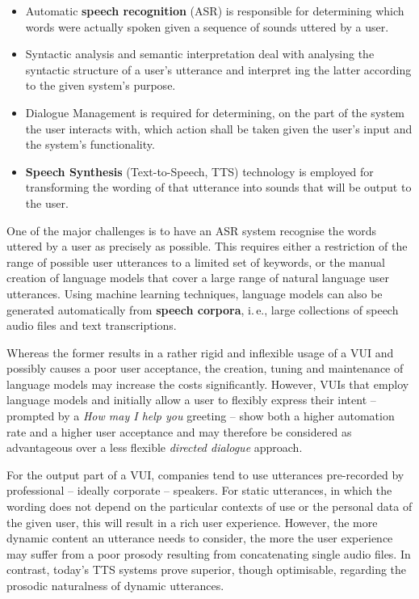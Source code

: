 \begin{multicols}{2}
\begin{itemize}
\item Automatic \textbf{speech recognition} (ASR) is responsible for determining which words were actually spoken given a sequence of sounds uttered by a user.
\item Syntactic analysis and semantic interpretation deal with analysing the syntactic structure of a user’s utterance and interpret
ing the latter according to the given system’s purpose.
\item Dialogue Management is required for determining, on the part of the system the user interacts with, which action shall be taken given the user’s input and the system’s functionality.
\item \textbf{Speech Synthesis} (Text-to-Speech, TTS) technology is employed for transforming the wording of that utterance into sounds that will be output to the user. 
\end{itemize}
One of the major challenges is to have an ASR system recognise the words uttered by a user as precisely as possible. This requires either a restriction of the range of possible user utterances to a limited set of keywords, or the manual creation of language models that cover a large range of natural language user utterances.  Using machine learning techniques, language models can also be generated automatically from \textbf{speech corpora}, i.\,e., large collections of speech audio files and text transcriptions.

Whereas the former results in a rather rigid and inflexible usage of a VUI and possibly causes a poor user acceptance, the creation, tuning and maintenance of language models may increase the costs significantly. However, VUIs that employ language models and initially allow a user to flexibly express their intent -- prompted by a \textit{How may I help you} greeting -- show both a higher automation rate and a higher user acceptance and may therefore be considered as advantageous over a less flexible \textit{directed dialogue} approach.


For the output part of a VUI, companies tend to use utterances pre-recorded by professional -- ideally corporate -- speakers. For static utterances, in which the wording does not depend on the particular contexts of use or the personal data of the given user, this will result in a rich user experience. However, the more dynamic content an utterance needs to consider, the more the user experience may suffer from a poor prosody resulting from concatenating single audio files. In contrast, today’s TTS systems prove superior, though optimisable, regarding the prosodic naturalness of dynamic utterances.  


\end{multicols}
